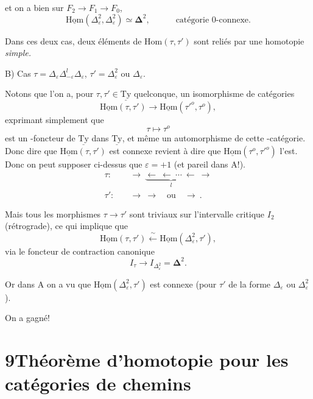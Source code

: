 \documentclass[11pt]{article}
\newcommand{\printedpage}[1]{\marginpar{\footnotesize p.~#1}}
\newcommand{\msp}[1]{\marginpar{\footnotesize [#1]}}
\newcommand{\uTy}{\underline{\mathrm{Ty}}}
\newcommand{\uHom}{\underline{\mathrm{Hom}}}
\begin{document}
et on a bien sur $F_2\longrightarrow F_1\longrightarrow F_0$, %
\[
\uHom(\Delta^2_\varepsilon,\Delta^2_\varepsilon)\simeq\boldsymbol{\Delta}^2,\qquad\quad\text{catégorie 0-connexe.}
\]

Dans ces deux cas, deux éléments de $\mathrm{Hom}(\tau,\tau')$ sont reliés par une homotopie \textit{simple.}

\msp{page 93}

B) Cas $\tau=\Delta_\varepsilon\Delta^l_{-\varepsilon}\Delta_\varepsilon$, $\tau'=\Delta^2_\varepsilon$ ou $\Delta_\varepsilon$.

Notons que l'on a, pour $\tau,\tau'\in\uTy$ quelconque, un isomorphisme de catégories
\[
\uHom(\tau,\tau')\longrightarrow\uHom(\tau'^o,\tau^o),
\]
exprimant simplement que
\[
\tau\longmapsto\tau^o
\]
est un -foncteur de $\uTy$ dans $\uTy$, et même un automorphisme de cette -catégorie. Donc dire que $\uHom(\tau,\tau')$ est connexe revient à dire que $\uHom(\tau^o,\tau'^o)$ l'est. Donc on peut supposer ci-dessus que $\varepsilon=+1$ (et pareil dans A!).
\[
\begin{aligned}
\tau :\quad & \longrightarrow\ \underbrace{\longleftarrow\ \longleftarrow\ \cdots\ \longleftarrow}_{l}\ \longrightarrow\\
\tau' :\quad & \longrightarrow\ \longrightarrow\quad\text{ou}\quad\longrightarrow\ .
\end{aligned}
\]

Mais tous les morphismes $\tau\longrightarrow\tau'$ sont triviaux sur l'intervalle critique $I_2$ (rétrograde), ce qui implique que
\[
\uHom(\tau,\tau')\xleftarrow{\ \sim\ }\uHom(\Delta^2_\varepsilon,\tau'),
\]
via le foncteur de contraction canonique
\[
I_\tau\longrightarrow I_{\Delta^2_\varepsilon}=\boldsymbol{\Delta}^2.
\]

Or dans A on a vu que $\uHom(\Delta^2_\varepsilon,\tau')$ est connexe (pour $\tau'$ de la forme $\Delta_\varepsilon$ ou $\Delta^2_\varepsilon$).

On a gagné!

\newpage
\printedpage{60}

\msp{page 94}

\section*{9\quad Théorème d'homotopie pour les catégories de chemins}
\end{document}
